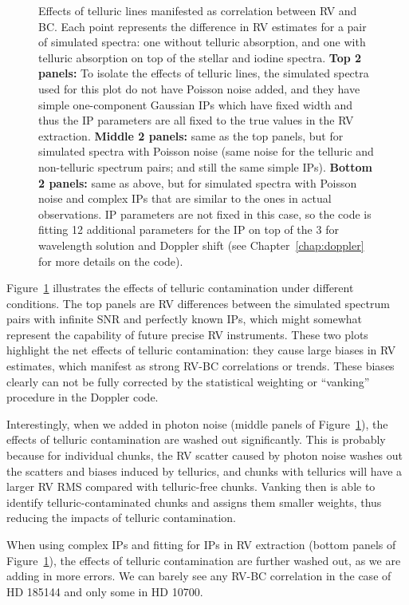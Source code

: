 \begin{figure}
\caption{Effects of telluric lines manifested as correlation between
  RV and BC. Each point represents the difference in RV estimates for
  a pair of simulated spectra: one without telluric absorption, and
  one with telluric absorption on top of the stellar and iodine
  spectra. {\bf Top 2 panels:} To isolate the effects of telluric
  lines, the simulated spectra used for this plot do not have Poisson
  noise added, and they have simple one-component Gaussian IPs which
  have fixed width and thus the IP parameters are all fixed to the
  true values in the RV extraction. {\bf Middle 2 panels:} same as the
  top panels, but for simulated spectra with Poisson noise (same noise
  for the telluric and non-telluric spectrum pairs; and still the same
  simple IPs). {\bf Bottom 2 panels:} same as above, but for simulated
  spectra with Poisson noise and complex IPs that are similar to the
  ones in actual observations. IP parameters are not fixed in this
  case, so the code is fitting 12 additional parameters for the IP on
  top of the 3 for wavelength solution and Doppler shift (see
  Chapter~\ref{chap:doppler} for more details on the code).
\label{telluric:fig:sim}}
\end{figure}

Figure~\ref{telluric:fig:sim} illustrates the effects of telluric
contamination under different conditions. The top panels are RV
differences between the simulated spectrum pairs with infinite SNR and
perfectly known IPs, which might somewhat represent the capability of
future precise RV instruments. These two plots highlight the net
effects of telluric contamination: they cause large biases in RV
estimates, which manifest as strong RV-BC correlations or
trends. These biases clearly can not be fully corrected by the
statistical weighting or ``vanking'' procedure in the Doppler code.

Interestingly, when we added in photon noise (middle panels of
Figure~\ref{telluric:fig:sim}), the effects of telluric contamination
are washed out significantly. This is probably because for individual
chunks, the RV scatter caused by photon noise washes out the scatters
and biases induced by tellurics, and chunks with tellurics will have a
larger RV RMS compared with telluric-free chunks. Vanking then is able
to identify telluric-contaminated chunks and assigns them smaller
weights, thus reducing the impacts of telluric contamination.

When using complex IPs and fitting for IPs in RV extraction (bottom
panels of Figure~\ref{telluric:fig:sim}), the effects of telluric
contamination are further washed out, as we are adding in more
errors. We can barely see any RV-BC correlation in the case of HD
185144 and only some in HD 10700.

